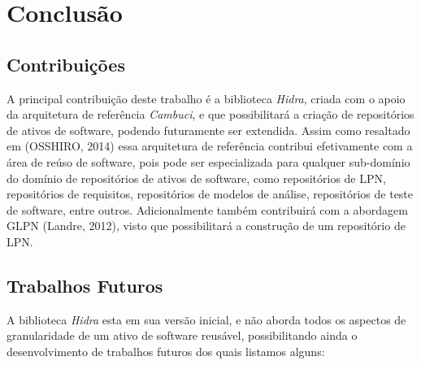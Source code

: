 \chapter{Conclusão} \label{chapter:conclusion}

\section{Contribuições}

A principal contribuição deste trabalho é a biblioteca \textit{Hidra}, criada com o apoio da arquitetura de referência \textit{Cambuci}\cite{dissertacaoOsshiro2014}, e que possibilitará a criação de repositórios de ativos de software, podendo futuramente ser extendida. Assim como resaltado em (OSSHIRO, 2014) essa arquitetura de referência contribui efetivamente com a área de reúso de software, pois pode ser especializada para qualquer sub-domínio do domínio de repositórios de ativos de software, como repositórios de LPN, repositórios de requisitos, repositórios de modelos de análise, repositórios de teste de software, entre outros. Adicionalmente também contribuirá com a abordagem GLPN (Landre, 2012), visto que possibilitará a construção de um repositório de LPN.

\section{Trabalhos Futuros}


A biblioteca \textit{Hidra} esta em sua versão inicial, e não aborda todos os aspectos de granularidade de um ativo de software reusável, possibilitando ainda o desenvolvimento de trabalhos futuros dos quais listamos alguns:

